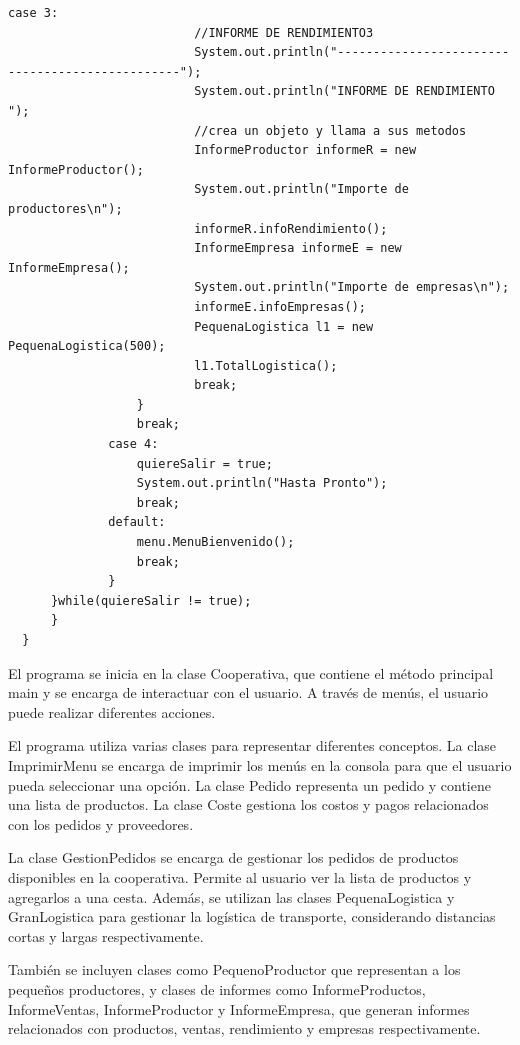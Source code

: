 \documentclass[10pt,a4paper]{article}
\begin{document}
\begin{lstlisting}[style=Java]
                      case 3:
                          //INFORME DE RENDIMIENTO3
                          System.out.println("------------------------------------------------");
                          System.out.println("INFORME DE RENDIMIENTO ");
                          //crea un objeto y llama a sus metodos
                          InformeProductor informeR = new InformeProductor();
                          System.out.println("Importe de productores\n");
                          informeR.infoRendimiento();
                          InformeEmpresa informeE = new InformeEmpresa();
                          System.out.println("Importe de empresas\n");
                          informeE.infoEmpresas();
                          PequenaLogistica l1 = new PequenaLogistica(500);
                          l1.TotalLogistica();
                          break;
                  }
                  break;
              case 4:
                  quiereSalir = true;
                  System.out.println("Hasta Pronto");
                  break;
              default:
                  menu.MenuBienvenido();
                  break;
              }
      }while(quiereSalir != true);  
      }
  }
\end{lstlisting}

El programa se inicia en la clase Cooperativa, que contiene el método principal main y se encarga de interactuar con el usuario. A través de menús, el usuario puede realizar diferentes acciones.

El programa utiliza varias clases para representar diferentes conceptos. La clase ImprimirMenu se encarga de imprimir los menús en la consola para que el usuario pueda seleccionar una opción. La clase Pedido representa un pedido y contiene una lista de productos. La clase Coste gestiona los costos y pagos relacionados con los pedidos y proveedores.

La clase GestionPedidos se encarga de gestionar los pedidos de productos disponibles en la cooperativa. Permite al usuario ver la lista de productos y agregarlos a una cesta. Además, se utilizan las clases PequenaLogistica y GranLogistica para gestionar la logística de transporte, considerando distancias cortas y largas respectivamente.

También se incluyen clases como PequenoProductor que representan a los pequeños productores, y clases de informes como InformeProductos, InformeVentas, InformeProductor y InformeEmpresa, que generan informes relacionados con productos, ventas, rendimiento y empresas respectivamente.
\end{document}
